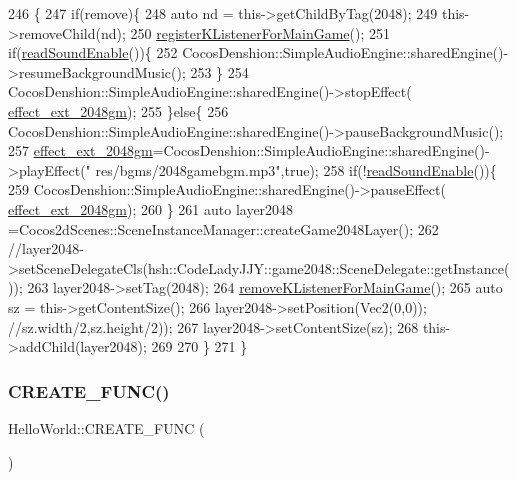 \begin{DoxyCode}
246                                                    \{
247     \textcolor{keywordflow}{if}(\textcolor{keyword}{remove})\{
248         \textcolor{keyword}{auto} nd = this->getChildByTag(2048);
249         this->removeChild(nd);
250         \hyperlink{class_hello_world_a15deb2e6546d6fd41267dc91932ade26}{registerKListenerForMainGame}();
251         \textcolor{keywordflow}{if}(\hyperlink{class_hello_world_a0f8c9d1b95e03b397e680b9dafb8f3d9}{readSoundEnable}())\{
252         CocosDenshion::SimpleAudioEngine::sharedEngine()->resumeBackgroundMusic();
253         \}
254         CocosDenshion::SimpleAudioEngine::sharedEngine()->stopEffect(
      \hyperlink{class_hello_world_a165832200ec4d9ee283167ac727eeade}{effect\_ext\_2048gm});
255     \}\textcolor{keywordflow}{else}\{
256         CocosDenshion::SimpleAudioEngine::sharedEngine()->pauseBackgroundMusic();
257         \hyperlink{class_hello_world_a165832200ec4d9ee283167ac727eeade}{effect\_ext\_2048gm}=CocosDenshion::SimpleAudioEngine::sharedEngine()->playEffect(\textcolor{stringliteral}{"
      res/bgms/2048gamebgm.mp3"},\textcolor{keyword}{true});
258         \textcolor{keywordflow}{if}(!\hyperlink{class_hello_world_a0f8c9d1b95e03b397e680b9dafb8f3d9}{readSoundEnable}())\{
259             CocosDenshion::SimpleAudioEngine::sharedEngine()->pauseEffect(
      \hyperlink{class_hello_world_a165832200ec4d9ee283167ac727eeade}{effect\_ext\_2048gm});
260         \}
261         \textcolor{keyword}{auto} layer2048 =Cocos2dScenes::SceneInstanceManager::createGame2048Layer();
262         \textcolor{comment}{//layer2048->setSceneDelegateCls(hsh::CodeLadyJJY::game2048::SceneDelegate::getInstance());}
263         layer2048->setTag(2048);
264         \hyperlink{class_hello_world_aa4aaf4a6d2ae2e0cb07273d0ee004861}{removeKListenerForMainGame}();
265         \textcolor{keyword}{auto} sz = this->getContentSize();
266         layer2048->setPosition(Vec2(0,0)); \textcolor{comment}{//sz.width/2,sz.height/2));}
267         layer2048->setContentSize(sz);
268         this->addChild(layer2048);
269         
270     \}
271 \}
\end{DoxyCode}
\mbox{\label{class_hello_world_a857ebfbc49f3a7f81772bee4991d186b}} 
\subsubsection{\texorpdfstring{C\+R\+E\+A\+T\+E\+\_\+\+F\+U\+N\+C()}{CREATE\_FUNC()}}
{\footnotesize\ttfamily Hello\+World\+::\+C\+R\+E\+A\+T\+E\+\_\+\+F\+U\+NC (\begin{DoxyParamCaption}\item[{\hyperlink{class_hello_world}{Hello\+World}}]{ }\end{DoxyParamCaption})}

